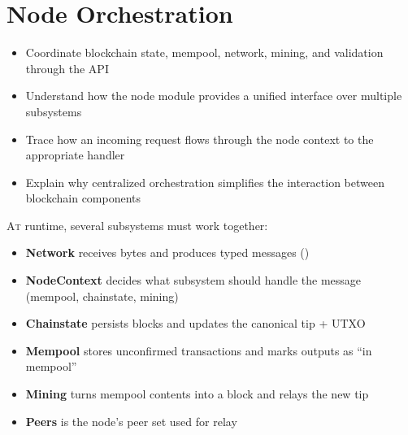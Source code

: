 \chapter{Node Orchestration}
\label{ch:node-orchestration}

\begin{learnbox}
\begin{itemize}
  \item Coordinate blockchain state, mempool, network, mining, and validation through the  API
  \item Understand how the node module provides a unified interface over multiple subsystems
  \item Trace how an incoming request flows through the node context to the appropriate handler
  \item Explain why centralized orchestration simplifies the interaction between blockchain components
\end{itemize}
\end{learnbox}

\lettrine{A}{t} runtime, several subsystems must work together:

\begin{itemize}
  \item \textbf{Network} receives bytes and produces typed messages ()
  \item \textbf{NodeContext} decides what subsystem should handle the message (mempool, chainstate, mining)
  \item \textbf{Chainstate} persists blocks and updates the canonical tip + UTXO
  \item \textbf{Mempool} stores unconfirmed transactions and marks outputs as ``in mempool''
  \item \textbf{Mining} turns mempool contents into a block and relays the new tip
  \item \textbf{Peers} is the node's peer set used for relay
\end{itemize}

